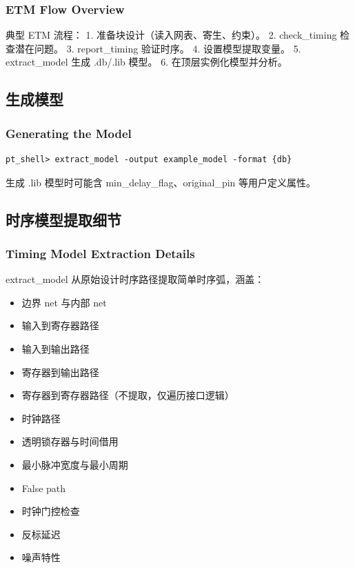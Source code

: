 \subsubsection*{ETM Flow Overview}

典型 ETM 流程：
1. 准备块设计（读入网表、寄生、约束）。
2. check_timing 检查潜在问题。
3. report_timing 验证时序。
4. 设置模型提取变量。
5. extract_model 生成 .db/.lib 模型。
6. 在顶层实例化模型并分析。

\subsection{生成模型}
\subsubsection*{Generating the Model}

\begin{lstlisting}
pt_shell> extract_model -output example_model -format {db}
\end{lstlisting}

生成 .lib 模型时可能含 min_delay_flag、original_pin 等用户定义属性。

\subsection{时序模型提取细节}
\subsubsection*{Timing Model Extraction Details}

extract_model 从原始设计时序路径提取简单时序弧，涵盖：
\begin{itemize}
  \item 边界 net 与内部 net
  \item 输入到寄存器路径
  \item 输入到输出路径
  \item 寄存器到输出路径
  \item 寄存器到寄存器路径（不提取，仅遍历接口逻辑）
  \item 时钟路径
  \item 透明锁存器与时间借用
  \item 最小脉冲宽度与最小周期
  \item False path
  \item 时钟门控检查
  \item 反标延迟
  \item 噪声特性
\end{itemize}

